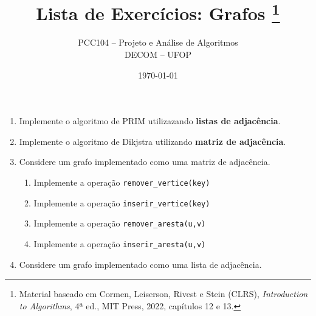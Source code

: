 \documentclass[10pt,a4paper]{extarticle}
\title{Lista de Exercícios: Grafos \footnote{Material baseado em Cormen, Leiserson, Rivest e Stein (CLRS), \emph{Introduction to Algorithms}, 4ª ed., MIT Press, 2022, capítulos 12 e 13.}}
\author{PCC104 -- Projeto e Análise de Algoritmos \\ DECOM -- UFOP}
\date{\today}
\begin{document}
\maketitle

\begin{enumerate}
  \item Implemente o algoritmo de PRIM utilizazando \textbf{listas de adjacência}. 
  \item Implemente o algoritmo de Dikjstra utilizando \textbf{matriz de adjacência}.
  \item Considere um grafo implementado como uma matriz de adjacência.
  \begin{enumerate}
    \item Implemente a operação \texttt{remover\_vertice(key)}
    \item Implemente a operação \texttt{inserir\_vertice(key)}
    \item Implemente a operação \texttt{remover\_aresta(u,v)}
    \item Implemente a operação \texttt{inserir\_aresta(u,v)}
  \end{enumerate}
  \item Considere um grafo implementado como uma lista de adjacência.
\end{enumerate}


\end{document}
